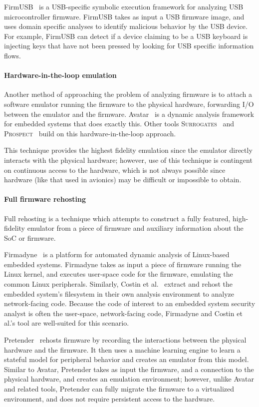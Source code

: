 FirmUSB~\cite{firmusb} is a USB-specific symbolic execution framework for analyzing USB microcontroller firmware. 
FirmUSB takes as input a USB firmware image, and uses domain specific analyses  to identify malicious behavior by the USB device.
For example, FirmUSB can detect if a device claiming to be a USB keyboard is injecting keys that have not been pressed by looking for USB specific information flows.

\paragraph{Hardware-in-the-loop emulation} 
Another method of approaching the problem of analyzing firmware is to attach a software emulator running the firmware to the physical hardware, forwarding I/O between the emulator and the firmware.
Avatar~\cite{avatar} is a dynamic analysis framework for embedded systems that does exactly this.
Other tools 
\textsc{Surrogates}~\cite{surrogates} and \textsc{Prospect}~\cite{kammerstetter2014prospect} build on this hardware-in-the-loop approach.

This technique provides the highest fidelity emulation since the emulator directly interacts with the physical hardware; however, use of this technique is contingent on continuous access to the hardware, which is not always possible since hardware (like that used in avionics) may be difficult or impossible to obtain.

\paragraph{Full firmware rehosting} 
Full rehosting is a technique which attempts to construct a fully featured, high-fidelity emulator from a piece of firmware and auxiliary information about the SoC or firmware.

Firmadyne~\cite{firmadyne} is a platform for automated dynamic analysis of Linux-based embedded systems.
Firmadyne takes as input a piece of firmware running the Linux kernel, and executes user-space code for the firmware, emulating the common Linux peripherals.
Similarly, Costin et al.~\cite{costin2014large, costin2016automated} extract and rehost the embedded system's filesystem in their own analysis environment to analyze network-facing code.
Because the code of interest to an embedded system security analyst is often the user-space, network-facing code, Firmadyne and Costin et al.'s tool are well-suited for this scenario. 

Pretender~\cite{pretender2019} rehosts firmware by recording the interactions between the physical hardware and the firmware. 
It then uses a machine learning engine to learn a stateful model for peripheral behavior and creates an emulator from this model.
Similar to Avatar, Pretender takes as input the firmware, and a connection to the physical hardware, and creates an emulation environment; however, unlike Avatar and related tools, Pretender can fully migrate the firmware to a virtualized environment, and does not require persistent access to the hardware.


